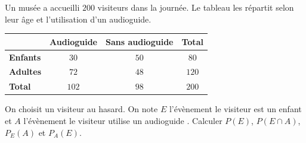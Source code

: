 \documentclass[10pt,a4paper]{article}
\begin{document}
\begin{bloc}
\begin{exple}
Un musée a accueilli \(200\) visiteurs dans la journée. Le tableau les répartit selon leur âge et l'utilisation d'un audioguide.

\begin{center}
\renewcommand{\arraystretch}{1.5}
\begin{tabular}{|l|c|c|c|}
    \hline
    & \textbf{Audioguide} & \textbf{Sans audioguide} & \textbf{Total} \\ \hline
    \textbf{Enfants} & \(30\) & \(50\) & \(80\) \\ \hline
    \textbf{Adultes} & \(72\) & \(48\) & \(120\) \\ \hline
    \textbf{Total} & \(102\) & \(98\) & \(200\) \\ \hline
\end{tabular}
\end{center}

On choisit un visiteur au hasard. On note \(E\) l'évènement \og le visiteur est un enfant \fg{} et \(A\) l'évènement \og le visiteur utilise un audioguide \fg{}. Calculer \(P(E)\), \(P(E\cap A)\), \(P_E(A)\) et \(P_A(E)\).
\end{exple}
\end{bloc}
\end{document}
